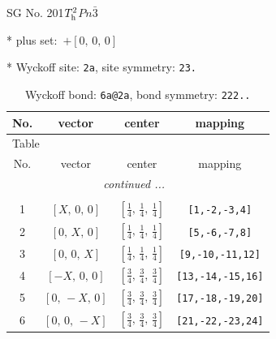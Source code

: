 \documentclass[fleqn,8pt]{jsarticle}
\begin{document}
\setcounter{MaxMatrixCols}{32}

\renewcommand{\tablename}{Table~}
\renewcommand{\figurename}{Figure~}
\begin{center}
\LARGE
SG No. 201\quad$T_{\rm h}^{2}$\quad$Pn\bar{3}$\quad[ cubic ]
\end{center}

* plus set:\,\,\,$+\left[ 0,\, 0,\, 0 \right]$


* Wyckoff site: {\tt 2a}, site symmetry: {\tt 23.}
\renewcommand{\arraystretch}{1.2}
\begin{longtable}{cccc}
\caption{Wyckoff bond: {\tt 6a@2a}, bond symmetry: {\tt 222..}}
 \\
 \hline \hline
No. & vector & center & mapping \\ \hline \endfirsthead

\multicolumn{3}{l}{\tablename\ \thetable{}} \\
 \hline \hline
No. & vector & center & mapping \\ \hline \endhead

 \hline \hline
\multicolumn{3}{r}{\footnotesize\it continued ...} \\ \endfoot

 \hline \hline
\multicolumn{3}{r}{} \\ \endlastfoot

1 & $\left[ X,\, 0,\, 0 \right]$ & $\left[ \frac{1}{4},\, \frac{1}{4},\, \frac{1}{4} \right]$ & {\tt [1,-2,-3,4]} \\ \hline
2 & $\left[ 0,\, X,\, 0 \right]$ & $\left[ \frac{1}{4},\, \frac{1}{4},\, \frac{1}{4} \right]$ & {\tt [5,-6,-7,8]} \\ \hline
3 & $\left[ 0,\, 0,\, X \right]$ & $\left[ \frac{1}{4},\, \frac{1}{4},\, \frac{1}{4} \right]$ & {\tt [9,-10,-11,12]} \\ \hline
4 & $\left[ - X,\, 0,\, 0 \right]$ & $\left[ \frac{3}{4},\, \frac{3}{4},\, \frac{3}{4} \right]$ & {\tt [13,-14,-15,16]} \\ \hline
5 & $\left[ 0,\, - X,\, 0 \right]$ & $\left[ \frac{3}{4},\, \frac{3}{4},\, \frac{3}{4} \right]$ & {\tt [17,-18,-19,20]} \\ \hline
6 & $\left[ 0,\, 0,\, - X \right]$ & $\left[ \frac{3}{4},\, \frac{3}{4},\, \frac{3}{4} \right]$ & {\tt [21,-22,-23,24]} \\
\end{longtable}
\renewcommand{\arraystretch}{1.2}
\end{document}
